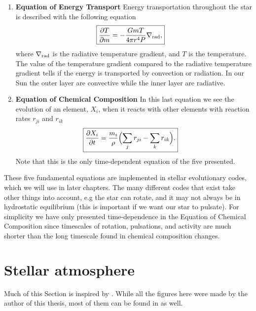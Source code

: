 \begin{enumerate}
    \item \textbf{Equation of Energy Transport}
        \nicebreak
        Energy transportation throughout the star is described with the
        following equation
        \begin{align}
            \Aboxed{\pd{T}{m} &= -\frac{GmT}{4\pi r^4P}\nabla_\tm{rad},}
        \end{align}
        where $\nabla_{\textnormal{rad}}$ is the radiative temperature gradient, and $T$
        is the temperature. The value of the temperature gradient compared to
        the radiative temperature gradient tells if the energy is transported by
        convection or radiation. In our Sun the outer layer are convective while
        the inner layer are radiative.

    \item \textbf{Equation of Chemical Composition}
        \nicebreak
        In this last equation we see the evolution of an element, $X_i$, when
        it reacts with other elements with reaction rates $r_{ji}$ and $r_{ik}$
        \begin{align}
            \Aboxed{\pd{X_i}{t} &= \frac{m_i}{\rho} \Bigl( \sum_j r_{ji} - \sum_k r_{ik}\Bigr).}
        \end{align}
        Note that this is the only time-dependent equation of the five
        presented.
\end{enumerate}

These five fundamental equations are implemented in stellar evolutionary codes,
which we will use in later chapters. The many different codes that exist take
other things into account, e.g the star can rotate, and it may not always be in
hydrostatic equilibrium (this is important if we want our star to pulsate). For
simplicity we have only presented time-dependence in the Equation of Chemical
Composition since timescales of rotation, pulsations, and activity are much
shorter than the long timescale found in chemical composition changes.


\section{Stellar atmosphere}

Much of this Section is inspired by \citet{Gray2006}. While all the figures here
were made by the author of this thesis, most of them can be found in
\citet{Gray2006} as well.

